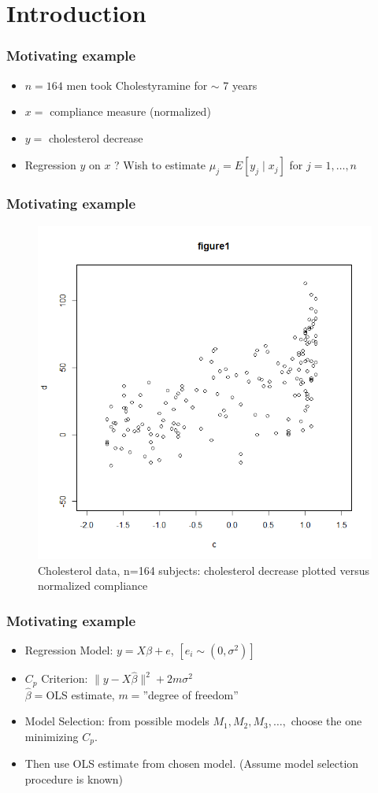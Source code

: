 \documentclass{beamer}
\begin{document}
\section{Introduction}
\begin{frame}
\frametitle{Motivating example}
\begin{itemize}
\item $n=164$ men took Cholestyramine for $\sim$ 7 years
\item $x=$ compliance measure (normalized)
\item $y=$ cholesterol decrease
\item Regression $y$ on $x$ ? Wish to estimate $\mu_j = E[y_j \mid x_j]$ for $j=1,\dots,n$
\end{itemize}
\end{frame}
\begin{frame}
\frametitle{Motivating example}
\begin{figure}[h]
\centering
\includegraphics[width=200bp, height= 180bp]{figure1-1.png}
\caption{Cholesterol data, n=164 subjects: cholesterol decrease plotted versus normalized compliance}
\end{figure}
\end{frame}
\begin{frame}
\frametitle{Motivating example}
\begin{itemize}
\item Regression Model: $y= X\beta + e$, $[e_i \sim (0, \sigma^2)]$
\item $C_p$ Criterion: $\| y-X\hat{\beta}\|^2 + 2m\sigma^2$\\
$\hat{\beta}=$OLS estimate, $m=$''degree of freedom''
\item Model Selection: from possible models $M_1, M_2, M_3, \dots,$ choose the one minimizing $C_p$.
\item Then use OLS estimate from chosen model. (Assume model selection procedure is known)
\end{itemize}
\end{frame}
\end{document}
